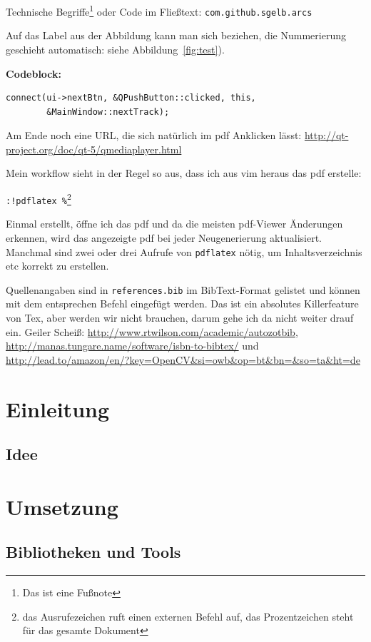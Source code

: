 Technische Begriffe\footnote{Das ist eine Fußnote} oder Code im Fließtext:
\texttt{com.github.sgelb.arcs}

Auf das Label aus der Abbildung kann man sich beziehen, die Nummerierung
geschieht automatisch: siehe Abbildung~\ref{fig:test}).


\textbf{Codeblock:}

\begin{lstlisting}
connect(ui->nextBtn, &QPushButton::clicked, this,
        &MainWindow::nextTrack);
\end{lstlisting}

Am Ende noch eine URL, die sich natürlich im pdf Anklicken lässt:
\url{http://qt-project.org/doc/qt-5/qmediaplayer.html}

Mein workflow sieht in der Regel so aus, dass ich aus vim heraus das pdf
erstelle:

\texttt{:!pdflatex \%}\footnote{das Ausrufezeichen ruft einen
externen Befehl auf, das Prozentzeichen steht für das gesamte Dokument}

Einmal erstellt, öffne ich das pdf und da die meisten pdf-Viewer Änderungen
erkennen, wird das angezeigte pdf bei jeder Neugenerierung aktualisiert.
Manchmal sind zwei oder drei Aufrufe von \texttt{pdflatex} nötig, um
Inhaltsverzeichnis etc korrekt zu erstellen.

Quellenangaben sind in \texttt{references.bib} im BibText-Format
\citep{wiki:bibtex} gelistet und können mit dem entsprechen Befehl eingefügt
werden. Das ist ein absolutes Killerfeature von Tex, aber werden wir nicht
brauchen, darum gehe ich da nicht weiter drauf ein. Geiler Scheiß:
\url{http://www.rtwilson.com/academic/autozotbib},
\url{http://manas.tungare.name/software/isbn-to-bibtex/} und
\url{http://lead.to/amazon/en/?key=OpenCV&si=owb&op=bt&bn=&so=ta&ht=de}




\section{Einleitung}  %
\subsection{Idee}  %

\section{Umsetzung}  %
\subsection{Bibliotheken und Tools}  %
